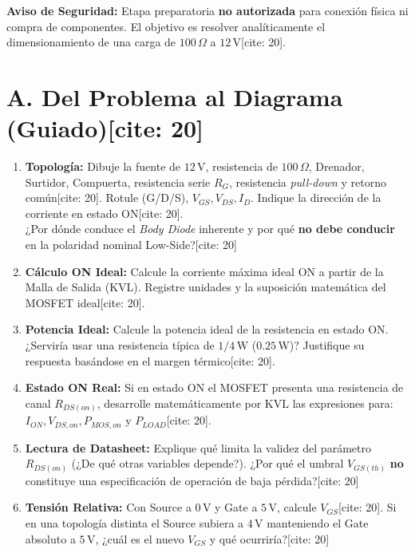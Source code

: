 \documentclass[11pt, a4paper]{article}
\begin{document}
\begin{tcolorbox}[colback=ucbblue!5, colframe=ucbblue, title=\textbf{Hito 3 · E1 — Guía Autónoma de Diseño Low-Side (ESTUDIANTES)[cite: 20]}]
    \textbf{Aviso de Seguridad:} Etapa preparatoria \textbf{no autorizada} para conexión física ni compra de componentes. El objetivo es resolver analíticamente el dimensionamiento de una carga de $100\,\Omega$ a $12\,\text{V}$[cite: 20].
\end{tcolorbox}

\section*{A. Del Problema al Diagrama (Guiado)[cite: 20]}
\begin{enumerate}
    \item \textbf{Topología:} Dibuje la fuente de $12\,\text{V}$, resistencia de $100\,\Omega$, Drenador, Surtidor, Compuerta, resistencia serie $R_G$, resistencia \textit{pull-down} y retorno común[cite: 20]. Rotule (G/D/S), $V_{GS}, V_{DS}, I_D$. Indique la dirección de la corriente en estado ON[cite: 20]. \\
    ¿Por dónde conduce el \textit{Body Diode} inherente y por qué \textbf{no debe conducir} en la polaridad nominal Low-Side?[cite: 20] \hrulefill \\[0.2cm] \hrulefill
    
    \item \textbf{Cálculo ON Ideal:} Calcule la corriente máxima ideal ON a partir de la Malla de Salida (KVL). Registre unidades y la suposición matemática del MOSFET ideal[cite: 20]. \hrulefill
    
    \item \textbf{Potencia Ideal:} Calcule la potencia ideal de la resistencia en estado ON. ¿Serviría usar una resistencia típica de $1/4\,\text{W}$ ($0.25\,\text{W}$)? Justifique su respuesta basándose en el margen térmico[cite: 20]. \hrulefill \\[0.2cm] \hrulefill
    
    \item \textbf{Estado ON Real:} Si en estado ON el MOSFET presenta una resistencia de canal $R_{DS(on)}$, desarrolle matemáticamente por KVL las expresiones para: $I_{ON}, V_{DS,on}, P_{MOS,on}$ y $P_{LOAD}$[cite: 20]. \hrulefill \\[0.2cm] \hrulefill
    
    \item \textbf{Lectura de Datasheet:} Explique qué limita la validez del parámetro $R_{DS(on)}$ (¿De qué otras variables depende?). ¿Por qué el umbral $V_{GS(th)}$ \textbf{no} constituye una especificación de operación de baja pérdida?[cite: 20] \hrulefill \\[0.2cm] \hrulefill
    
    \item \textbf{Tensión Relativa:} Con Source a $0\,\text{V}$ y Gate a $5\,\text{V}$, calcule $V_{GS}$[cite: 20]. Si en una topología distinta el Source subiera a $4\,\text{V}$ manteniendo el Gate absoluto a $5\,\text{V}$, ¿cuál es el nuevo $V_{GS}$ y qué ocurriría?[cite: 20] \hrulefill
\end{enumerate}
\end{document}
